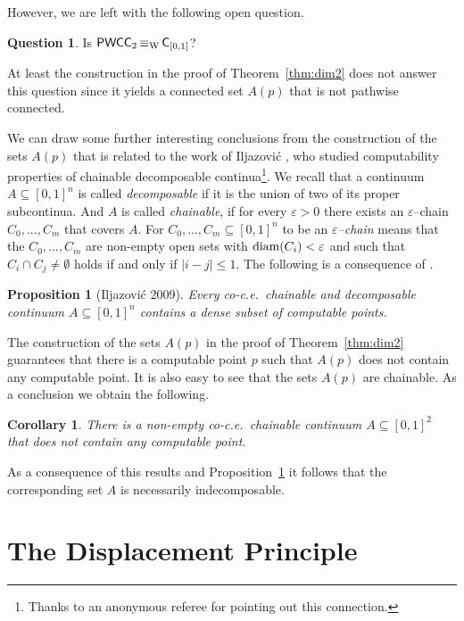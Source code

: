 \documentclass[a4paper]{amsart}
\def\In{\subseteq}
\def\diam{{\rm diam}}
\def\C{\mbox{\rm\sffamily C}}
\def\PWCC{\text{\rm\sffamily PWCC}}
\def\equivW{\mathop{\equiv_{\mathrm{W}}}}
\newtheorem{proposition}[theorem]{Proposition}
\newtheorem{corollary}[theorem]{Corollary}
\theoremstyle{definition}
\newtheorem{question}[theorem]{Question}
\begin{document}
However, we are left with the following open question.

\begin{question}
Is $\PWCC_2\equivW\C_{[0,1]}$?
\end{question}

At least the construction in the proof of Theorem~\ref{thm:dim2} does not answer this question
since it yields a connected set $A(p)$ that is not pathwise connected.

We can draw some further interesting conclusions from the construction of the sets $A(p)$
that is related to the work of Iljazovi{\'c} \cite{Ilj09}, who studied computability properties
of chainable decomposable continua\footnote{Thanks to an anonymous referee for pointing
out this connection.}.
We recall that a continuum $A\In[0,1]^n$ is called {\em decomposable} if it is the union of two of its proper
subcontinua. And $A$ is called {\em chainable}, if for every $\varepsilon>0$ there exists 
an $\varepsilon$--chain $C_0,...,C_m$ that covers $A$. For $C_0,...,C_m\In[0,1]^n$ to be
an {\em $\varepsilon$--chain} means that the $C_0,...,C_m$ are non-empty open sets with $\diam(C_i)<\varepsilon$
and such that $C_i\cap C_j\not=\emptyset$ holds if and only if $|i-j|\leq1$.
The following is a consequence of \cite[Theorem~44]{Ilj09}.

\begin{proposition}[Iljazovi{\'c} 2009]
\label{prop:Ilja09}
Every co-c.e.\ chainable and decomposable continuum $A\In[0,1]^n$ contains a dense subset of computable points.
\end{proposition}

The construction of the sets $A(p)$ in the proof of Theorem~\ref{thm:dim2} guarantees that
there is a computable point $p$ such that $A(p)$ does not contain any computable point.
It is also easy to see that the sets $A(p)$ are chainable. As a conclusion we obtain the following.

\begin{corollary}
There is a non-empty co-c.e.\ chainable continuum $A\In[0,1]^2$ that does not contain any
computable point.
\end{corollary}

As a consequence of this results and Proposition~\ref{prop:Ilja09} it follows that the corresponding
set $A$ is necessarily indecomposable. 


\section{The Displacement Principle}
\label{sec:displacement}
\end{document}
